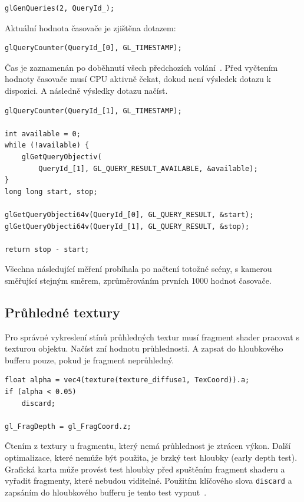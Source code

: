\documentclass[thesis=M,czech]{FITthesis}[2019/12/23]
\begin{document}
\begin{verbatim}
glGenQueries(2, QueryId_);
\end{verbatim}

Aktuální hodnota časovače je zjištěna dotazem:

\begin{verbatim}
glQueryCounter(QueryId_[0], GL_TIMESTAMP);
\end{verbatim}

Čas je zaznamenán po doběhnutí všech předchozích volání~\cite{kronos_counter}. Před vyčtením hodnoty časovače musí CPU aktivně čekat, dokud není výsledek dotazu k dispozici. A následně výsledky dotazu načíst.

\begin{verbatim}
glQueryCounter(QueryId_[1], GL_TIMESTAMP);

int available = 0;
while (!available) {
    glGetQueryObjectiv(
        QueryId_[1], GL_QUERY_RESULT_AVAILABLE, &available);
}
long long start, stop;

glGetQueryObjecti64v(QueryId_[0], GL_QUERY_RESULT, &start);
glGetQueryObjecti64v(QueryId_[1], GL_QUERY_RESULT, &stop);

return stop - start;
\end{verbatim}

Všechna následující měření probíhala po načtení totožné scény, s kamerou směřující stejným směrem, zprůměrováním prvních 1000 hodnot časovače.

\subsection{Průhledné textury}

Pro správné vykreslení stínů průhledných textur musí fragment shader pracovat s texturou objektu. Načíst zní hodnotu průhlednosti. A zapsat do hloubkového bufferu pouze, pokud je fragment neprůhledný.

\begin{verbatim}
float alpha = vec4(texture(texture_diffuse1, TexCoord)).a;
if (alpha < 0.05)
    discard;

gl_FragDepth = gl_FragCoord.z;
\end{verbatim}

Čtením z textury u fragmentu, který nemá průhlednost je ztrácen výkon. Další optimalizace, které nemůže být použita, je brzký test hloubky (early depth test). Grafická karta může provést test hloubky před spuštěním fragment shaderu a vyřadit fragmenty, které nebudou viditelné. Použitím klíčového slova \texttt{discard} a zapsáním do hloubkového bufferu je tento test vypnut~\cite{kronos_eft}.
\end{document}
